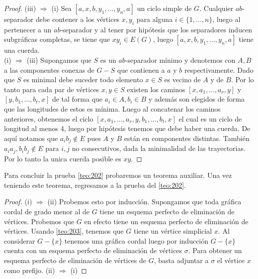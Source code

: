 \begin{proof}
    (iii) $\Rightarrow$ (i) Sea $[a,x,b, y_1, \dots, y_n, a]$ un ciclo simple de
    $G$. Cualquier $ab$-separador debe contener a los vértices $x,y_i$ para
    alguna $i\in \{1, \dots, n \}$, luego al pertenecer a un $ab$-separador y al
    tener por hipótesis que los separadores inducen subgráficas completas, se
    tiene que $xy_i \in E(G)$, luego $[a,x,b, y_1, \dots, y_n, a]$ tiene una
    cuerda.\\
    
    (i) $\Rightarrow$ (iii) Supongamos que $S$ es un $ab$-separador mínimo y
    denotemos con $A,B$ a las componentes conexas de $G-S$ que contienen a $a$ y
    $b$ respectivamente. Dado que $S$ es minimal debe suceder todo elemento
    $x\in S$ es vecino de $A$ y de $B$. Por lo tanto para cada par de vértices
    $x,y\in S$ existen los caminos $[x,a_1, \dots, a_r,y]$ y $[y,b_1,\dots,
    b_t,x]$ de tal forma que $a_i\in A, b_i\in B$ y además son elegidos de forma
    que las longitudes de estos es mínima. Luego al concatenar los caminos
    anteriores, obtenemos el ciclo $[x,a_1, \dots, a_r,y,b_1,\dots, b_t,x]$ el
    cual es un ciclo de longitud al menos 4, luego por hipótesis tenemos que
    debe haber una cuerda. De aquí notamos que $a_ib_j\notin E$ pues $A$ y $B$
    están en componentes distintas. También $a_ia_j, b_ib_j \notin E$ para $i,j$
    no consecutivos, dada la minimalidad de las trayectorias. Por lo tanto la
    unica cuerda posible es $xy$.
    
\end{proof}

Para concluir la prueba \cref{teo:202} probaremos un teorema auxiliar. Una vez
teniendo este teorema, regresamos a la prueba del \cref{teo:202}. 
\begin{proof}
    (i) $\Rightarrow$ (ii) Probemos esto por inducción. Supongamos que toda
    gráfica cordal de grado menor al de $G$ tiene un esquema perfecto de
    eliminación de vértices. Probemos que $G$ en efecto tiene un esquema
    perfecto de eliminación de vértices. Usando \cref{teo:203}, tenemos que $G$
    tiene un vértice simplicial $x$. Al considerar $G-\{x\}$ tenemos una gráfica
    cordal luego por inducción $G-\{x\}$ cuenta con un esquema perfecto de
    eliminación de vértices $\sigma $. Para obtener un esquema perfecto de
    eliminación de vértices de $G$, basta adjuntar a $\sigma$ el vértice $x$
    como prefijo. (ii) $\Rightarrow$ (i) 
    
\end{proof}

